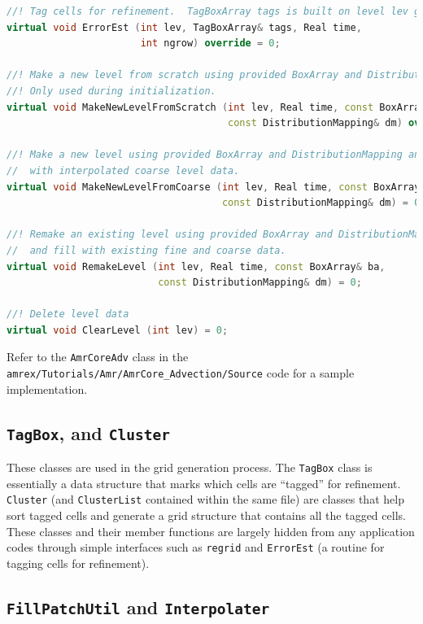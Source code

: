 \begin{lstlisting}[language=cpp]
//! Tag cells for refinement.  TagBoxArray tags is built on level lev grids.
virtual void ErrorEst (int lev, TagBoxArray& tags, Real time, 
                       int ngrow) override = 0;

//! Make a new level from scratch using provided BoxArray and DistributionMapping.
//! Only used during initialization.
virtual void MakeNewLevelFromScratch (int lev, Real time, const BoxArray& ba, 
                                      const DistributionMapping& dm) override = 0;

//! Make a new level using provided BoxArray and DistributionMapping and fill 
//  with interpolated coarse level data.
virtual void MakeNewLevelFromCoarse (int lev, Real time, const BoxArray& ba, 
                                     const DistributionMapping& dm) = 0;

//! Remake an existing level using provided BoxArray and DistributionMapping 
//  and fill with existing fine and coarse data.
virtual void RemakeLevel (int lev, Real time, const BoxArray& ba, 
                          const DistributionMapping& dm) = 0;

//! Delete level data
virtual void ClearLevel (int lev) = 0;
\end{lstlisting}
Refer to the {\tt AmrCoreAdv} class in the 
{\tt amrex/Tutorials/Amr/AmrCore\_Advection/Source} 
code for a sample implementation.

\subsection{{\tt TagBox}, and {\tt Cluster}}
These classes are used in the grid generation process.
The {\tt TagBox} class is essentially a data structure that marks which
cells are ``tagged'' for refinement.
{\tt Cluster} (and {\tt ClusterList} contained within the same file) are classes
that help sort tagged cells and generate a grid structure that contains all
the tagged cells.  These classes and their member functions are largely
hidden from any application codes through simple interfaces
such as {\tt regrid} and {\tt ErrorEst} (a routine for tagging cells for refinement).

\subsection{{\tt FillPatchUtil} and {\tt Interpolater}}\label{sec:amrcore:fillpatch}

